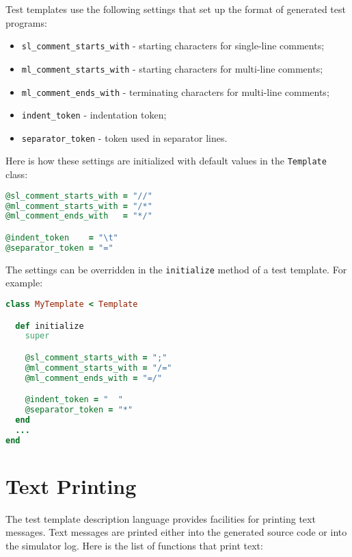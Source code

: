 \documentclass[oneside,final,12pt]{extreport}
\begin{document}
Test templates use the following settings that set up the format of generated 
test programs:

\begin{itemize}
\item \texttt{sl{\_}comment{\_}starts{\_}with} - starting characters for single-line comments;
\item \texttt{ml{\_}comment{\_}starts{\_}with} - starting characters for multi-line comments;
\item \texttt{ml{\_}comment{\_}ends{\_}with} - terminating characters for multi-line comments;
\item \texttt{indent{\_}token} - indentation token;
\item \texttt{separator{\_}token} - token used in separator lines.
\end{itemize}

Here is how these settings are initialized with default values in
the \texttt{Template} class:

\begin{lstlisting}[language=ruby]
@sl_comment_starts_with = "//"
@ml_comment_starts_with = "/*"
@ml_comment_ends_with   = "*/"

@indent_token    = "\t"
@separator_token = "="
\end{lstlisting}

The settings can be overridden in the \texttt{initialize} method of a test template.
For example:

\begin{lstlisting}[language=ruby]
class MyTemplate < Template

  def initialize
    super

    @sl_comment_starts_with = ";" 
    @ml_comment_starts_with = "/="
    @ml_comment_ends_with = "=/"

    @indent_token = "  "
    @separator_token = "*" 
  end
  ...
end
\end{lstlisting}


\section{Text Printing}

The test template description language provides facilities for printing text messages.
Text messages are printed either into the generated source code or into the simulator log.
Here is the list of functions that print text:
\end{document}
